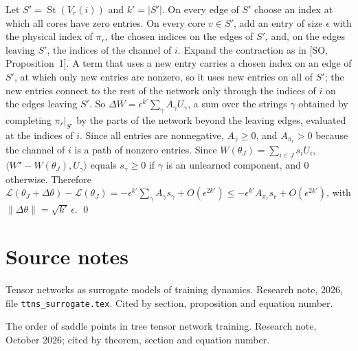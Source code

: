 \documentclass[11pt]{article}
\newcommand{\ip}[2]{\langle #1,#2\rangle}
\newcommand{\norm}[1]{\lVert #1\rVert}
\newcommand{\St}{\operatorname{St}}
\newcommand{\TS}{\textsf{TS}}
\newcommand{\SO}{\textsf{SO}}
\newcommand{\so}[1]{[\SO, #1]}
\theoremstyle{definition}
\numberwithin{equation}{section}
\begin{document}
Let $S'=\St(V_r(i))$ and $k'=|S'|$. On every edge of $S'$ choose an index at which all cores have zero entries. On every core $v\in S'$, add an entry of size $\epsilon$ with the physical index of $\pi_r$, the chosen indices on the edges of $S'$, and, on the edges leaving $S'$, the indices of the channel of $i$. Expand the contraction as in \so{Proposition~1}. A term that uses a new entry carries a chosen index on an edge of $S'$, at which only new entries are nonzero, so it uses new entries on all of $S'$; the new entries connect to the rest of the network only through the indices of $i$ on the edges leaving $S'$. So $\Delta W=\epsilon^{k'}\sum_\gamma A_\gamma U_\gamma$, a sum over the strings $\gamma$ obtained by completing $\pi_r|_{S'}$ by the parts of the network beyond the leaving edges, evaluated at the indices of $i$. Since all entries are nonnegative, $A_\gamma\ge0$, and $A_{\pi_r}>0$ because the channel of $i$ is a path of nonzero entries. Since $W(\theta_J)=\sum_{i\in J}s_iU_i$, $\ip{W^\star-W(\theta_J)}{U_\gamma}$ equals $s_\gamma\ge0$ if $\gamma$ is an unlearned component, and $0$ otherwise. Therefore $\mathcal L(\theta_J+\Delta\theta)-\mathcal L(\theta_J)=-\epsilon^{k'}\sum_\gamma A_\gamma s_\gamma+O(\epsilon^{2k'})\le-\epsilon^{k'}A_{\pi_r}s_r+O(\epsilon^{2k'})$, with $\norm{\Delta\theta}=\sqrt{k'}\,\epsilon$. \qed

\section*{Source notes}
\begin{description}[leftmargin=3.2em,style=nextline,nosep]
\item[{[\TS]}] Tensor networks as surrogate models of training dynamics. Research note, 2026, file \texttt{ttns\_surrogate.tex}. Cited by section, proposition and equation number.
\item[{[\SO]}] The order of saddle points in tree tensor network training. Research note, October 2026; cited by theorem, section and equation number.
\end{description}
\end{document}
